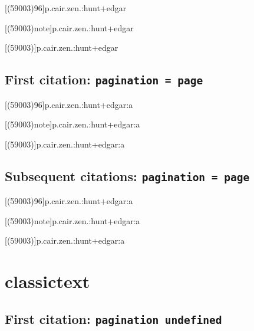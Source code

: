 \documentclass[a4paper]{article}
\begin{document}
\cite[(59003)1:96]{p.cair.zen.:hunt+edgar}

\cite[(59003)96]{p.cair.zen.:hunt+edgar}

[(59003)96]{p.cair.zen.:hunt+edgar}

\AtNextCite{\renewcommand*{\volcitedelim}{\addcomma\space}}
[(59003)note]{p.cair.zen.:hunt+edgar}

[(59003)]{p.cair.zen.:hunt+edgar}

\cite[(59003)note]{p.cair.zen.:hunt+edgar}

\subsection{First citation: \texttt{pagination = page}}

\citereset
\cite{p.cair.zen.:hunt+edgar:a}

\citereset
\cite[(59003)1:96]{p.cair.zen.:hunt+edgar:a}

\citereset
\cite[(59003)96]{p.cair.zen.:hunt+edgar:a}

\citereset
{}[(59003)96]{p.cair.zen.:hunt+edgar:a}

\citereset
{}[(59003)note]{p.cair.zen.:hunt+edgar:a}

\citereset
{}[(59003)]{p.cair.zen.:hunt+edgar:a}

\citereset
\cite[(59003)note]{p.cair.zen.:hunt+edgar:a}

\subsection{Subsequent citations: \texttt{pagination = page}}

\cite{p.cair.zen.:hunt+edgar:a}

\cite[(59003)1:96]{p.cair.zen.:hunt+edgar:a}

\cite[(59003)96]{p.cair.zen.:hunt+edgar:a}

[(59003)96]{p.cair.zen.:hunt+edgar:a}

[(59003)note]{p.cair.zen.:hunt+edgar:a}

[(59003)]{p.cair.zen.:hunt+edgar:a}

\cite[(59003)note]{p.cair.zen.:hunt+edgar:a}

\section{classictext}

\subsection{First citation: \texttt{pagination undefined}}
\end{document}
